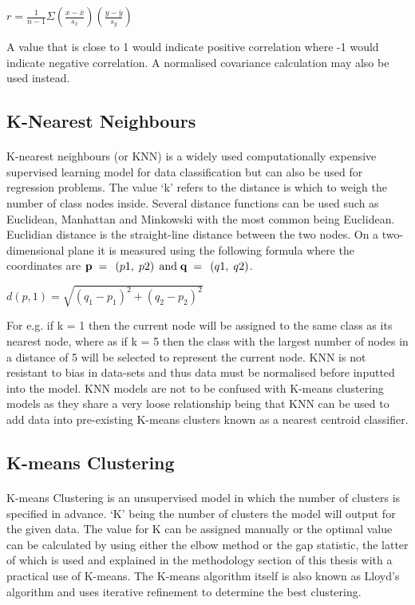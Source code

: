 $r = \frac{1}{{n - 1}}\Sigma \left( {\frac{{x - \bar x}}{{{s_x}}}} \right)\left( {\frac{{y - \bar y}}{{{s_y}}}} \right)$

A value that is close to 1 would indicate positive correlation where -1 would indicate negative correlation. A normalised covariance calculation may also be used instead.
\subsection{K-Nearest Neighbours} 
\paragraph{}K-nearest neighbours (or KNN) is a widely used computationally expensive supervised learning model for data classification but can also be used for regression problems. The value ‘k’ refers to the distance is which to weigh the number of class nodes inside. Several distance functions can be used such as Euclidean, Manhattan and Minkowski with the most common being Euclidean. Euclidian distance is the straight-line distance between the two nodes. On a two-dimensional plane it is measured using the following formula where the coordinates are ${\bf{p}}{\rm{\;}} = {\rm{\;}}\left( {p1,{\rm{\;}}p2} \right){\rm{\;and\;}}{\bf{q}}{\rm{\;}} = {\rm{\;}}\left( {q1,{\rm{\;}}q2} \right)$.

$d\left( {p,1} \right) = \sqrt {{{\left( {{q_1} - {p_1}} \right)}^2} + {{\left( {{q_2} - {p_2}} \right)}^2}} \;\;$

For e.g. if k = 1 then the current node will be assigned to the same class as its nearest node, where as if k = 5 then the class with the largest number of nodes in a distance of 5 will be selected to represent the current node. KNN is not resistant to bias in data-sets and thus data must be normalised before inputted into the model. KNN models are not to be confused with K-means clustering models as they share a very loose relationship being that KNN can be used to add data into pre-existing K-means clusters known as a nearest centroid classifier.
\subsection{K-means Clustering} 
\paragraph{}K-means Clustering is an unsupervised model in which the number of clusters is specified in advance. ‘K’ being the number of clusters the model will output for the given data. The value for K can be assigned manually or the optimal value can be calculated by using either the elbow method or the gap statistic, the latter of which is used and explained in the methodology section of this thesis with a practical use of K-means. The K-means algorithm itself is also known as Lloyd's algorithm and uses iterative refinement to determine the best clustering.
